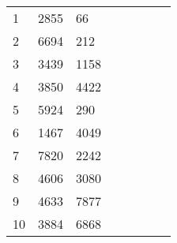 \begin{table}[tb]
\begin{tabular}{|l|l|l|lllll}
		1                        & 2855                      & 66                        &                           &                           &                           &                           &                           \\ \cline{1-3}
		2                        & 6694                      & 212                       &                           &                           &                           &                           &                           \\ \cline{1-3}
		3                        & 3439                      & 1158                      &                           &                           &                           &                           &                           \\ \cline{1-3}
		4                        & 3850                      & 4422                      &                           &                           &                           &                           &                           \\ \cline{1-3}
		5                        & 5924                      & 290                       &                           &                           &                           &                           &                           \\ \cline{1-3}
		6                        & 1467                      & 4049                      &                           &                           &                           &                           &                           \\ \cline{1-3}
		7                        & 7820                      & 2242                      &                           &                           &                           &                           &                           \\ \cline{1-3}
		8                        & 4606                      & 3080                      &                           &                           &                           &                           &                           \\ \cline{1-3}
		9                        & 4633                      & 7877                      &                           &                           &                           &                           &                           \\ \cline{1-3}
		10                       & 3884                      & 6868                      &                           &                           &                           &                           &                           \\ \cline{1-3}

\end{tabular}
\end{table}
